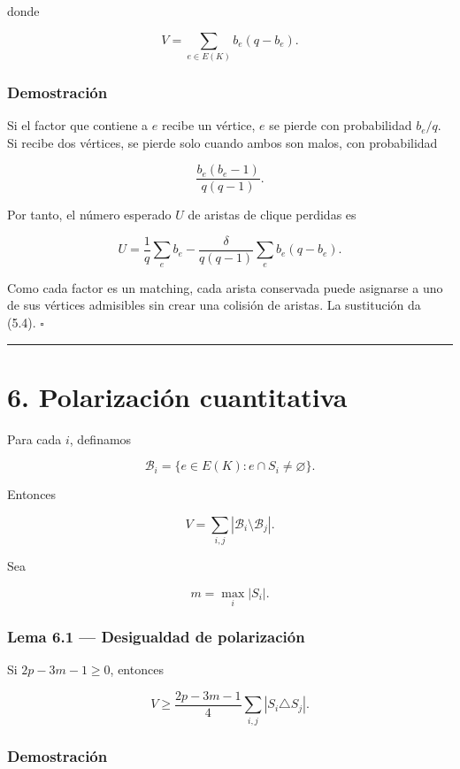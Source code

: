 \documentclass[
  11pt,
]{article}
\begin{document}
donde

\[
V=\sum_{e\in E(K)}b_e(q-b_e).
\tag{5.5}
\]

\subsubsection{Demostración}\label{demostraciuxf3n-4}

Si el factor que contiene a \(e\) recibe un vértice, \(e\) se pierde con probabilidad \(b_e/q\). Si recibe dos vértices, se pierde solo cuando ambos son malos, con probabilidad

\[
\frac{b_e(b_e-1)}{q(q-1)}.
\]

Por tanto, el número esperado \(U\) de aristas de clique perdidas es

\[
U
=
\frac1q\sum_e b_e
-
\frac{\delta}{q(q-1)}\sum_e b_e(q-b_e).
\]

Como cada factor es un matching, cada arista conservada puede asignarse a uno de sus vértices admisibles sin crear una colisión de aristas. La sustitución da (5.4). \(\square\)

\begin{center}\rule{0.5\linewidth}{0.5pt}\end{center}

\section{6. Polarización cuantitativa}\label{polarizaciuxf3n-cuantitativa}

Para cada \(i\), definamos

\[
\mathcal B_i=\{e\in E(K):e\cap S_i\ne\varnothing\}.
\]

Entonces

\[
V=\sum_{i,j}|\mathcal B_i\setminus\mathcal B_j|.
\tag{6.1}
\]

Sea

\[
m=\max_i|S_i|.
\]

\subsubsection{Lema 6.1 --- Desigualdad de polarización}\label{lema-6.1-desigualdad-de-polarizaciuxf3n}

Si \(2p-3m-1\ge0\), entonces

\[
\boxed{
V
\ge
\frac{2p-3m-1}{4}
\sum_{i,j}|S_i\triangle S_j|.
}
\tag{6.2}
\]

\subsubsection{Demostración}\label{demostraciuxf3n-5}
\end{document}
